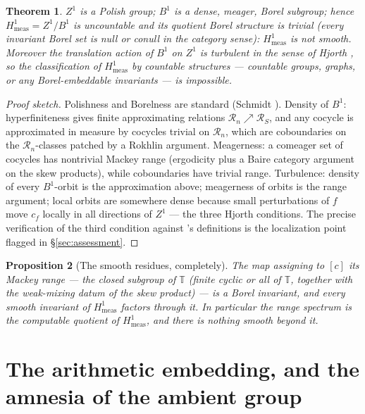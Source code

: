 \documentclass[11pt]{amsart}
\newtheorem{theorem}{Theorem}[section]
\newtheorem{proposition}[theorem]{Proposition}
\theoremstyle{remark}
\newcommand{\T}{\mathbb{T}}
\newcommand{\R}{\mathcal{R}}
\newcommand{\Hmeas}{H^1_{\mathrm{meas}}}
\begin{document}
\begin{theorem}\label{thm:structure}
$Z^1$ is a Polish group; $B^1$ is a dense, meager, Borel subgroup; hence
$\Hmeas=Z^1/B^1$ is uncountable and its quotient Borel structure is trivial (every
invariant Borel set is null or conull in the category sense): $\Hmeas$ is not smooth.
Moreover the translation action of $B^1$ on $Z^1$ is turbulent in the sense of Hjorth
\cite{Hjorth}, so the classification of $\Hmeas$ by countable structures --- countable
groups, graphs, or any Borel-embeddable invariants --- is impossible.
\end{theorem}

\begin{proof}[Proof sketch]
Polishness and Borelness are standard (Schmidt \cite{Schmidt}). Density of $B^1$:
hyperfiniteness gives finite approximating relations $\R_n\nearrow\R_S$, and any cocycle
is approximated in measure by cocycles trivial on $\R_n$, which are coboundaries on the
$\R_n$-classes patched by a Rokhlin argument. Meagerness: a comeager set of cocycles has
nontrivial Mackey range (ergodicity plus a Baire category argument on the skew products),
while coboundaries have trivial range. Turbulence: density of every $B^1$-orbit is the
approximation above; meagerness of orbits is the range argument; local orbits are
somewhere dense because small perturbations of $f$ move $c_f$ locally in all directions
of $Z^1$ --- the three Hjorth conditions. The precise verification of the third
condition against \cite{Hjorth}'s definitions is the localization point flagged in
\S\ref{sec:assessment}.
\end{proof}

\begin{proposition}[The smooth residues, completely]\label{prop:residues}
The map assigning to $[c]$ its Mackey range --- the closed subgroup of $\T$ (finite
cyclic or all of $\T$, together with the weak-mixing datum of the skew product) --- is a
Borel invariant, and every smooth invariant of $\Hmeas$ factors through it. In
particular the range spectrum is the computable quotient of $\Hmeas$, and there is
nothing smooth beyond it.
\end{proposition}

\section{The arithmetic embedding, and the amnesia of the ambient group}\label{sec:embedding}
\end{document}
